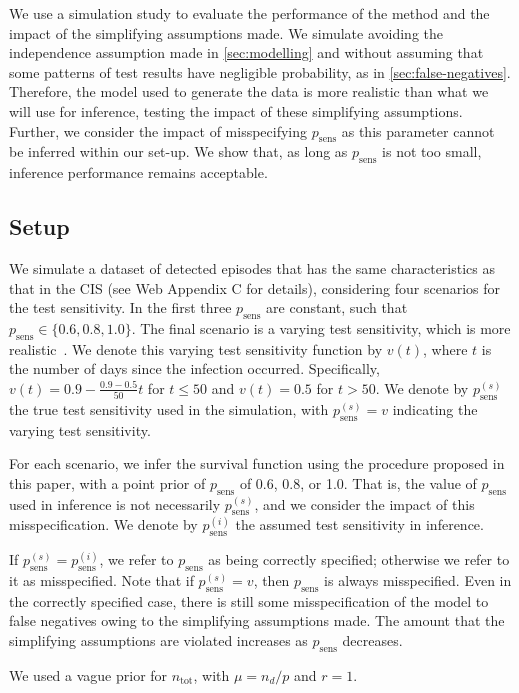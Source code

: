 \documentclass[referee,useAMS,usenatbib]{biom}
\newcommand{\psens}{p_\text{sens}}
\newcommand{\psenss}{p_\text{sens}^{(s)}}
\newcommand{\psensi}{p_\text{sens}^{(i)}}
\newcommand{\ntot}{n_\text{tot}}
\begin{document}
We use a simulation study to evaluate the performance of the method and the impact of the simplifying assumptions made.
We simulate avoiding the independence assumption made in \cref{sec:modelling} and without assuming that some patterns of test results have negligible probability, as in \cref{sec:false-negatives}.
Therefore, the model used to generate the data is more realistic than what we will use for inference, testing the impact of these simplifying assumptions.
Further, we consider the impact of misspecifying $\psens$ as this parameter cannot be inferred within our set-up.
We show that, as long as $\psens$ is not too small, inference performance remains acceptable.

\subsection{Setup}

We simulate a dataset of detected episodes that has the same characteristics as that in the CIS (see Web Appendix C for details), considering four scenarios for the test sensitivity.
In the first three $\psens$ are constant, such that $\psens \in \{ 0.6, 0.8, 1.0 \}$.
The final scenario is a varying test sensitivity, which is more realistic~\citep{blakeThesis}.
We denote this varying test sensitivity function by $v(t)$, where $t$ is the number of days since the infection occurred.
Specifically, $v(t) = 0.9 - \frac{0.9-0.5}{50}t$ for $t \leq 50$ and $v(t) = 0.5$ for $t > 50$.
We denote by $\psenss$ the true test sensitivity used in the simulation, with $\psenss = v$ indicating the varying test sensitivity.

For each scenario, we infer the survival function using the procedure proposed in this paper, with a point prior of $\psens$ of 0.6, 0.8, or 1.0.
That is, the value of $\psens$ used in inference is not necessarily $\psenss$, and we consider the impact of this misspecification.
We denote by $\psensi$ the assumed test sensitivity in inference.

If $\psenss = \psensi$, we refer to $\psens$ as being correctly specified; otherwise we refer to it as misspecified.
Note that if $\psenss = v$, then $\psens$ is always misspecified.
Even in the correctly specified case, there is still some misspecification of the model to false negatives owing to the simplifying assumptions made.
The amount that the simplifying assumptions are violated increases as $\psens$ decreases.

We used a vague prior for $\ntot$, with $\mu = n_d / p$ and $r = 1$.
\end{document}
